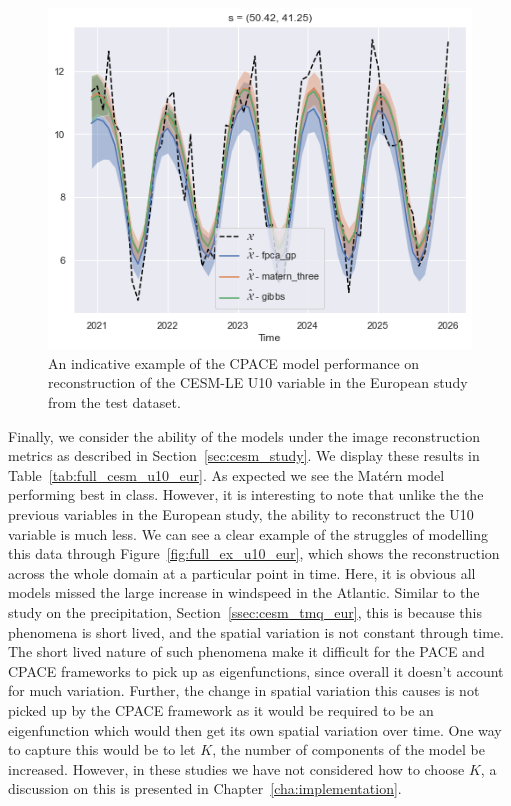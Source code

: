 \begin{figure}
	\centering
	\includegraphics[width=\textwidth]{test_ex_u10_eur}
	\caption{An indicative example of the CPACE model performance on reconstruction of the CESM-LE U10 variable in the European study from the test dataset.}
	\label{fig:test_ex_u10_eur}
\end{figure}

Finally, we consider the ability of the models under the image reconstruction metrics as described in Section~\ref{sec:cesm_study}.
We display these results in Table~\ref{tab:full_cesm_u10_eur}.
As expected we see the Mat\'ern model performing best in class.
However, it is interesting to note that unlike the the previous variables in the European study, the ability to reconstruct the U10 variable is much less.
We can see a clear example of the struggles of modelling this data through Figure~\ref{fig:full_ex_u10_eur}, which shows the reconstruction across the whole domain at a particular point in time.
Here, it is obvious all models missed the large increase in windspeed in the Atlantic.
Similar to the study on the precipitation, Section~\ref{ssec:cesm_tmq_eur}, this is because this phenomena is short lived, and the spatial variation is not constant through time.
The short lived nature of such phenomena make it difficult for the PACE and CPACE frameworks to pick up as eigenfunctions, since overall it doesn't account for much variation. 
Further, the change in spatial variation this causes is not picked up by the CPACE framework as it would be required to be an eigenfunction which would then get its own spatial variation over time. 
One way to capture this would be to let $K$, the number of components of the model be increased.
However, in these studies we have not considered how to choose $K$, a discussion on this is presented in Chapter~\ref{cha:implementation}.

